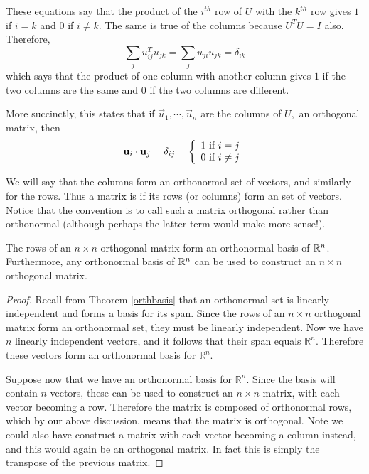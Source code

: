 \documentclass{ximera}
\begin{document}
These equations say that the product of the $i^{th}$ row of $U$ with the $k^{th}$ row
gives $1$ if $i=k$ and $0$ if $i\neq k.$ The same is true of the columns because
$U^{T}U=I$ also. Therefore,
\begin{equation*}
\sum_{j}u_{ij}^{T}u_{jk}=\sum_{j}u_{ji}u_{jk}=\delta _{ik}
\end{equation*}
which says that the product of one column with another column gives $1$ if the two
columns are the same and $0$ if the two columns are different.

More succinctly, this states that if $\vec{u}_{1},\cdots ,\vec{u}_{n}$
are the columns of $U,$ an orthogonal matrix, then
\[
\mathbf{u}_{i}\cdot \mathbf{u}_{j}=\delta _{ij} = \left\{
\begin{array}{c}
1\text{ if }i=j \\
0\text{ if }i\neq j
\end{array}
\right.
\]

We will say that the columns form an orthonormal set of vectors, and similarly for the rows. Thus a matrix is  if its rows (or columns) form an
 set of vectors. Notice that the convention is to call such a matrix orthogonal rather than orthonormal (although perhaps the latter term would make more sense!).

\begin{theorem}\label{orthbasis}
The rows of an $n \times n$ orthogonal matrix form an orthonormal
basis of $\mathbb{R}^n$. Furthermore, any orthonormal basis of
$\mathbb{R}^n$ can be used to construct an $n \times n$ orthogonal
matrix.
\end{theorem}

\begin{proof}
Recall from Theorem \ref{orthbasis} that an orthonormal set is
linearly independent and forms a basis for its span. Since the rows of
an $n \times n$ orthogonal matrix form an orthonormal set, they must
be linearly independent. Now we have $n$ linearly independent vectors,
and it follows that their span equals $\mathbb{R}^n$. Therefore these
vectors form an orthonormal basis for $\mathbb{R}^n$.

Suppose now that we have an orthonormal basis for $\mathbb{R}^n$. Since the
basis will contain $n$ vectors, these can be used to construct an $n
\times n$ matrix, with each vector becoming a row. Therefore the
matrix is composed of orthonormal rows, which by our above discussion,
means that the matrix is orthogonal. Note we could also have construct
a matrix with each vector becoming a column instead, and this would
again be an orthogonal matrix. In fact this is simply the transpose of
the previous matrix.
\end{proof}
\end{document}
